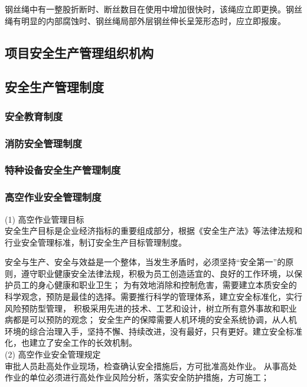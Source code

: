  钢丝绳中有一整股折断时、断丝数目在使用中增加很快时，该绳应立即更换。钢丝绳有明显的内部腐蚀时、钢丝绳局部外层钢丝伸长呈笼形态时，应立即报废。\\

\subsection{项目安全生产管理组织机构}

\subsection{安全生产管理制度}
\subsubsection{安全教育制度}

\subsubsection{消防安全管理制度}

\subsubsection{特种设备安全生产管理制度}

\subsubsection{高空作业安全管理制度}

(1) 高空作业管理目标\\

安全生产目标是企业经济指标的重要组成部分，根据《安全生产法》等法律法规和行业安全管理标准，制订安全生产目标管理制度。

安全与生产、安全与效益是一个整体，当发生矛盾时，必须坚持“安全第一”的原则，遵守职业健康安全法律法规，积极为员工创造适宜的、良好的工作环境，以保护员工的身心健康和职业卫生；
为有效地消除和控制危害，需要建立本质安全的科学观念，预防是最佳的选择。需要推行科学的管理体系，建立安全标准化，实行风险预防型管理，
积极采用先进的技术、工艺和设计，树立所有意外事故和职业病都是可以预防的观念；
安全生产的保障需要人机环境的安全系统协调，从人机环境的综合治理入手，坚持不懈、持续改进，没有最好，只有更好。建立安全标准化，也建立了安全工作的长效机制。\\

(2) 高空作业安全管理规定\\

 审批人员赴高处作业现场，检查确认安全措施后，方可批准高处作业。 从事高处作业的单位必须进行高处作业风险分析，落实安全防护措施，方可施工；

